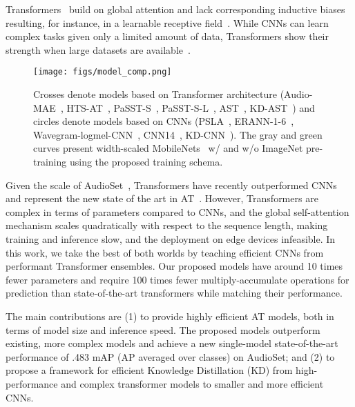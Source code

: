 \documentclass{article}
\begin{document}
Transformers~\cite{Vaswani17Attention} build on global attention and lack corresponding inductive biases resulting, for instance, in a learnable receptive field~\cite{Dosovitskiy20Image, Gong22CMKD}. While CNNs can learn complex tasks given only a limited amount of data, Transformers show their strength when large datasets are available~\cite{Dosovitskiy20Image, Touvron21Deit, Liu22convnext}. 

\begin{figure}[t!]
\centering
{\texttt{[image: figs/model\_comp.png]}}
\caption{Crosses denote models based on Transformer architecture (Audio-MAE~\cite{Huang22Masked}, HTS-AT~\cite{Chen22HTS-AT}, PaSST-S~\cite{Koutini21Passt}, PaSST-S-L~\cite{Koutini21Passt}, AST~\cite{Gong21Ast}, KD-AST~\cite{Gong22CMKD}) and circles denote models based on CNNs (PSLA~\cite{Gong21PSLA}, ERANN-1-6~\cite{Verbitskiy21ERANN}, Wavegram-logmel-CNN~\cite{Kong20PANNs}, CNN14~\cite{Kong20PANNs}, KD-CNN~\cite{Gong22CMKD}). The gray and green curves present width-scaled MobileNets~\cite{Howard19MobileNetV3} w/ and w/o ImageNet pre-training using the proposed training schema.}\label{fig:model_comp}\vspace{-14pt}
\end{figure}

Given the scale of AudioSet~\cite{audioset2017Gemmeke}, Transformers have recently outperformed CNNs and represent the new state of the art in AT~\cite{Huang22Masked, Chen22HTS-AT, Koutini21Passt, Gong21Ast}. However, Transformers are complex in terms of parameters compared to CNNs, and the global self-attention mechanism scales quadratically with respect to the sequence length, making training and inference slow, and the deployment on edge devices infeasible. In this work, we take the best of both worlds by teaching efficient CNNs from performant Transformer ensembles. Our proposed models have around 10 times fewer parameters and require 100 times fewer multiply-accumulate operations for prediction than state-of-the-art transformers while matching their performance.

The main contributions are (1) to provide highly efficient AT models, both in terms of model size and inference speed. The proposed models outperform existing, more complex models and achieve a new single-model state-of-the-art performance of .483 mAP (AP averaged over classes) on AudioSet; and (2) to propose a framework for efficient Knowledge Distillation (KD) from high-performance and complex transformer models to smaller and more efficient CNNs.
\end{document}
